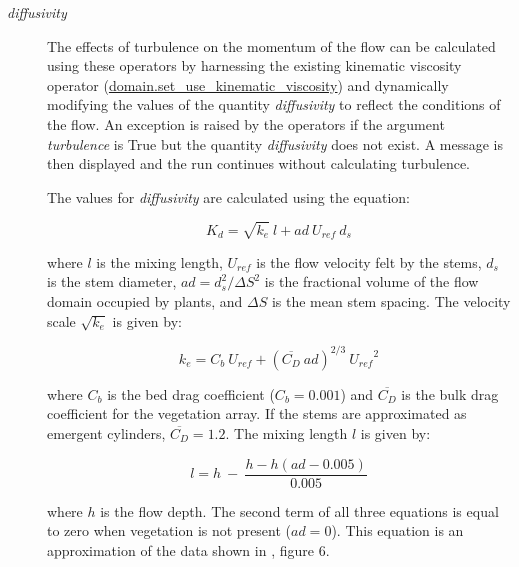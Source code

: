 \documentclass[10pt]{article}
\begin{document}
\begin{description}
\item[\textit{diffusivity}] \hfill

The effects of turbulence on the momentum of the flow can be calculated using these operators by harnessing the existing kinematic viscosity operator (\url{domain.set_use_kinematic_viscosity}) and dynamically modifying the values of the quantity \textit{diffusivity} to reflect the conditions of the flow. An exception is raised by the operators if the argument \textit{turbulence} is True but the quantity \textit{diffusivity} does not exist. A message is then displayed and the run continues without calculating turbulence.

The values for \textit{diffusivity} are calculated using the equation:

\begin{equation}
K_d = \sqrt{k_e} \: l + ad \: U_{ref} \: d_s
\end{equation}

\noindent where $l$ is the mixing length, $U_{ref}$ is the flow velocity felt by the stems, $d_s$ is the stem diameter, $ad = d_s^2 / \Delta S^2$ is the fractional volume of the flow domain occupied by plants, and $\Delta S$ is the mean stem spacing. The velocity scale $\sqrt{k_e}$ is given by:

\begin{equation}
k_e = C_b \: U_{ref} + (\overline{C_D} \: ad)^{2/3} \: {U_{ref}}^2
\end{equation}

\noindent where $C_b$ is the bed drag coefficient ($C_b = 0.001$) and $\overline{C_D}$ is the bulk drag coefficient for the vegetation array. If the stems are approximated as emergent cylinders, $\overline{C_D} = 1.2$. The mixing length $l$ is given by:

\begin{equation}
l = h \: -  \: \frac{h - h(ad - 0.005)}{0.005}
\end{equation}

\noindent where $h$ is the flow depth. The second term of all three equations is equal to zero when vegetation is not present ($ad = 0$). This equation is an approximation of the data shown in \citet{nepf1999drag}, figure 6.

\end{description}




\end{document}
